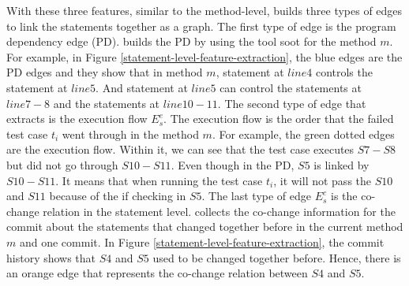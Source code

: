 With these three features, similar to the method-level, \tool builds three types of edges to link the statements together as a graph. The first type of edge is the program dependency edge (PD). \tool builds the PD by using the tool soot \cite{soot} for the method $m$. For example, in Figure \ref{statement-level-feature-extraction}, the blue edges are the PD edges and they show that in method $m$, statement at $line 4$ controls the statement at $line 5$. And statement at $line 5$ can control the statements at $line 7-8$ and the statements at $line 10-11$. The second type of edge that \tool extracts is the execution flow $E_s^e$. The execution flow is the order that the failed test case $t_i$ went through in the method $m$. For example, the green dotted edges are the execution flow. Within it, we can see that the test case executes $S7-S8$ but did not go through $S10-S11$. Even though in the PD, $S5$ is linked by $S10-S11$. It means that when running the test case $t_i$, it will not pass the $S10$ and $S11$ because of the if checking in $S5$. The last type of edge $E_s^c$ is the co-change relation in the statement level. \tool collects the co-change information for the commit about the statements that changed together before in the current method $m$ and one commit. In Figure \ref{statement-level-feature-extraction}, the commit history shows that $S4$ and $S5$ used to be changed together before. Hence, there is an orange edge that represents the co-change relation between $S4$ and $S5$.


